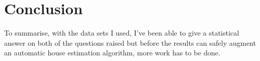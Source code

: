 \section{Conclusion}
To summarise, with the data sets I used, I've been able to give a statistical answer on both of the questions raised but before the results can safely augment an automatic house estimation algorithm, more work has to be done.